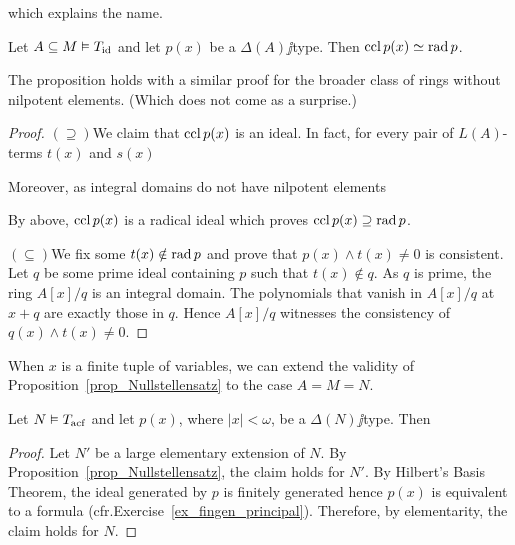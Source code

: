 \documentclass[creche.tex]{subfiles}
\begin{document}

which explains the name.



\begin{proposition}\label{prop_chiusura-radicale}
Let $A\subseteq M\models T_{\rm id}$ and let $p(x)$ be a $\Delta(A)\jj$type. Then $\ccl\,p(x)\simeq\rad p$.
\end{proposition}
The proposition holds with a similar proof for the broader class of rings without nilpotent elements. (Which does not come as a surprise.)
\begin{proof}
$(\supseteq)$\quad We claim that $\ccl\,p(x)$ is an ideal. In fact, for every pair of $L(A)$-terms $t(x)$ and $s(x)$



Moreover, as integral domains do not have nilpotent elements


By \ssf{\#} above, $\ccl\,p(x)$ is a radical ideal which proves $\ccl\,p(x)\supseteq \rad p$.

$(\subseteq)$\quad We fix some $t(x)\notin\rad p$ and prove that $p(x)\wedge t(x)\neq0$ is consistent. Let $q$ be some prime ideal containing $p$ such that $t(x)\notin q$.  As $q$ is prime, the ring $A[x]/q$ is an integral domain. The polynomials that vanish in  $A[x]/q$ at $x+q$ are exactly those in $q$. Hence $A[x]/q$ witnesses the consistency of $q(x)\wedge t(x)\neq0$.
\end{proof}

When $x$ is a finite tuple of variables, we can extend the validity of Proposition~\ref{prop_Nullstellensatz} to the case $A=M=N$.

\begin{corollary}\label{coroll_Nullstellensatz}
Let $N\models T_{\rm acf}$ and let $p(x)$, where $|x|<\omega$, be a $\Delta(N)\jj$type. Then


\end{corollary}



\begin{proof}
Let $N'$ be a large elementary extension of $N$. By Proposition~\ref{prop_Nullstellensatz}, the claim holds for $N'$. By Hilbert's Basis Theorem, the ideal generated by $p$ is finitely generated hence $p(x)$ is equivalent to a formula (cfr.\@ Exercise~\ref{ex_fingen_principal}). Therefore, by elementarity, the claim holds for $N$.
\end{proof}
\end{document}
